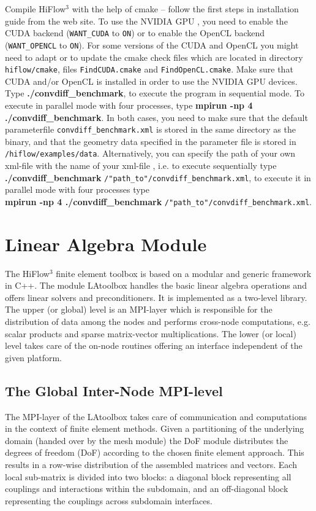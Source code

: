 \documentclass[a4paper, 11pt, twoside]{article}
\begin{document}
Compile HiFlow$^3$ with the help of cmake -- follow the first steps in installation
guide from the web site.
To use the NVIDIA GPU \cite{NVIDIAGPU}, you need to enable the CUDA  \cite{CUDA} backend (\verb'WANT_CUDA'
to \verb'ON') or to enable the OpenCL  \cite{OPENCL} backend (\verb'WANT_OPENCL' to
\verb'ON'). For some versions of the CUDA and OpenCL you might need to adapt
or to update the cmake check files which are located in directory
\verb'hiflow/cmake', files \verb'FindCUDA.cmake' and \verb'FindOpenCL.cmake'.
Make sure that CUDA and/or OpenCL  is installed in order to use the NVIDIA GPU devices. 
Type \textbf{./convdiff\_benchmark}, to execute the program in sequential mode. 
To execute in parallel mode with four processes, type \textbf{mpirun -np 4 ./convdiff\_benchmark}. 
In both cases, you need to make sure that the default parameterfile \verb'convdiff_benchmark.xml' 
is stored in the same directory as the binary, and that the geometry data specified in the parameter 
file is stored in \verb'/hiflow/examples/data'. Alternatively, you can specify the path of your own xml-file 
with the name of your xml-file , i.e. to execute sequentially type 
\textbf{./convdiff\_benchmark} \verb'/"path_to"/convdiff_benchmark.xml',
to execute it in parallel mode with four processes type \\
\textbf{mpirun  -np 4 ./convdiff\_benchmark} \verb'/"path_to"/convdiff_benchmark.xml'. 


\section{Linear Algebra Module}

The HiFlow${}^3$ finite element toolbox is based on a modular and generic
framework in C++. The module LAtoolbox handles the basic linear algebra
operations and offers linear solvers and preconditioners. It is implemented
as a two-level library. The upper (or global) level is an MPI-layer which
is responsible for the distribution of data among the nodes and performs 
cross-node computations, e.g. scalar products and sparse matrix-vector 
multiplications. The lower (or local) level takes care of the on-node 
routines offering an interface independent of the given platform.

\subsection{The Global Inter-Node MPI-level}

The MPI-layer of the LAtoolbox takes care of communication and computations in 
the context of finite element methods. Given a partitioning of the underlying 
domain (handed over by the mesh module) the DoF
module distributes the degrees of freedom (DoF)
according to the chosen finite element approach. This results in a
row-wise distribution of the assembled matrices and vectors. Each local
sub-matrix is divided into two blocks: a diagonal block representing all
couplings and interactions within the subdomain, and an off-diagonal block
representing the couplings across subdomain interfaces.
\end{document}
